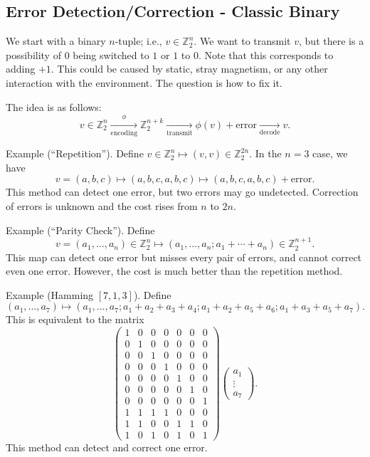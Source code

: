 \documentclass[12pt]{article}
\theoremstyle{definition}
\newcommand{\Z}{\mathbb{Z}}
\begin{document}
\subsection{Error Detection/Correction - Classic Binary}

We start with a binary $n$-tuple; i.e., $v \in \Z_2^n$. We want to transmit $v$, but there is a possibility of $0$ being switched to $1$ or $1$ to $0$. Note that this corresponds to adding $+1$. This could be caused by static, stray magnetism, or any other interaction with the environment. The question is how to fix it.

The idea is as follows:
\[
v \in \Z_2^n \xrightarrow[\text{encoding}]\phi \Z_2^{n+k} \xrightarrow[\text{transmit}]{} \phi(v)+\text{error} \xrightarrow[\text{decode}]{} v.
\]

Example (``Repetition''). Define $v \in \Z_2^n \mapsto (v,v) \in \Z_2^{2n}$. In the $n=3$ case, we have
\[
v=(a,b,c) \mapsto (a,b,c,a,b,c) \mapsto (a,b,c,a,b,c)+\text{error}.
\]
This method can detect one error, but two errors may go undetected. Correction of errors is unknown and the cost rises from $n$ to $2n$.

Example (``Parity Check''). Define
\[
v=(a_1,\ldots,a_n) \in \Z_2^n \mapsto (a_1,\ldots,a_n; a_1+\cdots+a_n) \in \Z_2^{n+1}.
\]
This map can detect one error but misses every pair of errors, and cannot correct even one error. However, the cost is much better than the repetition method.

Example (Hamming $[7,1,3]$). Define
\[
(a_1,\ldots,a_7) \mapsto (a_1,\ldots,a_7; a_1+a_2+a_3+a_4; a_1+a_2+a_5+a_6; a_1+a_3+a_5+a_7).
\]
This is equivalent to the matrix
\[
\begin{pmatrix}
1 & 0 & 0 & 0 & 0 & 0 & 0\\
0 & 1 & 0 & 0 & 0 & 0 & 0\\
0 & 0 & 1 & 0 & 0 & 0 & 0\\
0 & 0 & 0 & 1 & 0 & 0 & 0\\
0 & 0 & 0 & 0 & 1 & 0 & 0\\
0 & 0 & 0 & 0 & 0 & 1 & 0\\
0 & 0 & 0 & 0 & 0 & 0 & 1\\
1 & 1 & 1 & 1 & 0 & 0 & 0\\
1 & 1 & 0 & 0 & 1 & 1 & 0\\
1 & 0 & 1 & 0 & 1 & 0 & 1
\end{pmatrix}
\begin{pmatrix}a_1\\ \vdots \\ a_7\end{pmatrix}.
\]
This method can detect and correct one error.
\end{document}
